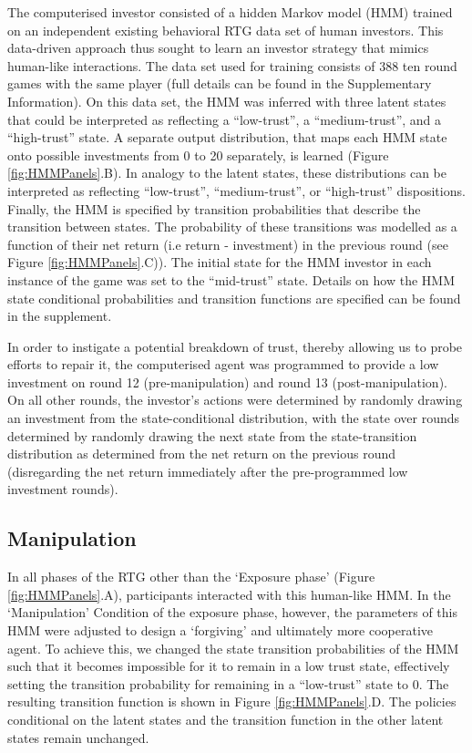 \documentclass[
]{article}
\begin{document}
The computerised investor consisted of a hidden Markov model (HMM)
trained on an independent existing behavioral RTG data set of human
investors. This data-driven approach thus sought to learn an investor
strategy that mimics human-like interactions. The data set used for
training consists of 388 ten round games with the same player (full
details can be found in the Supplementary Information). On this data
set, the HMM was inferred with three latent states that could be
interpreted as reflecting a ``low-trust'', a ``medium-trust'', and a
``high-trust'' state. A separate output distribution, that maps each HMM
state onto possible investments from 0 to 20 separately, is learned
(Figure \ref{fig:HMMPanels}.B). In analogy to the latent states, these
distributions can be interpreted as reflecting ``low-trust'',
``medium-trust'', or ``high-trust'' dispositions. Finally, the HMM is
specified by transition probabilities that describe the transition
between states. The probability of these transitions was modelled as a
function of their net return (i.e return - investment) in the previous
round (see Figure \ref{fig:HMMPanels}.C)). The initial state for the
HMM investor in each instance of the game was set to the ``mid-trust''
state. Details on how the HMM state conditional probabilities and
transition functions are specified can be found in the supplement.

In order to instigate a potential breakdown of trust, thereby allowing
us to probe efforts to repair it, the computerised agent was programmed
to provide a low investment on round 12 (pre-manipulation) and round 13
(post-manipulation). On all other rounds, the investor's actions were
determined by randomly drawing an investment from the state-conditional
distribution, with the state over rounds determined by randomly drawing
the next state from the state-transition distribution as determined from
the net return on the previous round (disregarding the net return
immediately after the pre-programmed low investment rounds).

\subsection{Manipulation}\label{manipulation}

In all phases of the RTG other than the `Exposure phase' (Figure
\ref{fig:HMMPanels}.A), participants interacted with this human-like
HMM. In the `Manipulation' Condition of the exposure phase, however, the
parameters of this HMM were adjusted to design a `forgiving' and
ultimately more cooperative agent. To achieve this, we changed the state
transition probabilities of the HMM such that it becomes impossible for
it to remain in a low trust state, effectively setting the transition
probability for remaining in a ``low-trust'' state to 0. The resulting
transition function is shown in Figure \ref{fig:HMMPanels}.D. The
policies conditional on the latent states and the transition function in
the other latent states remain unchanged.
\end{document}
